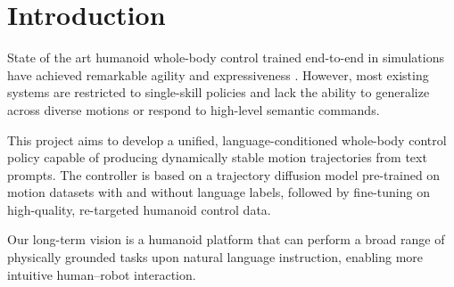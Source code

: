 \section{Introduction}
State of the art humanoid whole-body control trained end-to-end in simulations have achieved remarkable agility and expressiveness 
\cite{liao2025beyondmimicmotiontrackingversatile, ji2024exbody2, cheng2024express, zhang2025falcon, li2025amo}.
However, most existing systems are restricted to single-skill policies and lack the ability to generalize across diverse motions or respond to high-level semantic commands.

This project aims to develop a unified, language-conditioned whole-body control policy capable of producing dynamically stable motion trajectories from text prompts. 
The controller is based on a trajectory diffusion model pre-trained on motion datasets with and without language labels, followed by fine-tuning on high-quality, re-targeted humanoid control data.

Our long-term vision is a humanoid platform that can perform a broad range of physically grounded tasks upon natural language instruction, enabling more intuitive human–robot interaction.